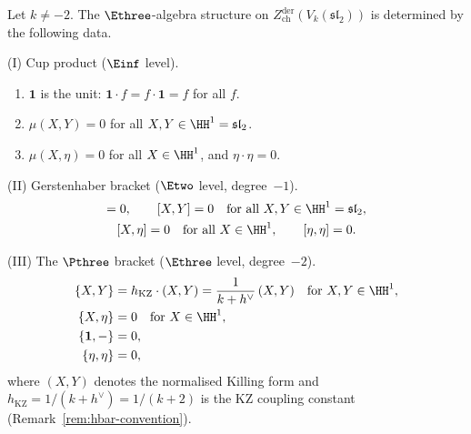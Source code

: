 \begin{proposition}
\label{prop:e3-explicit-sl2}
Let $k \neq -2$.
The $\Ethree$-algebra structure on
$Z^{\mathrm{der}}_{\mathrm{ch}}(V_k(\mathfrak{sl}_2))$
is determined by the following data.

\smallskip
\noindent
\textup{(I) Cup product} ($\Einf$ level).
\begin{enumerate}[label=\textup{(\alph*)}]
\item $\mathbf{1}$ is the unit:
  $\mathbf{1} \cdot f = f \cdot \mathbf{1} = f$ for all $f$.
\item
  $\mu(X, Y) = 0$ for all $X, Y \in \HH^1 = \mathfrak{sl}_2$.
\item
  $\mu(X, \eta) = 0$ for all $X \in \HH^1$, and
  $\eta \cdot \eta = 0$.
\end{enumerate}

\smallskip
\noindent
\textup{(II) Gerstenhaber bracket} ($\Etwo$ level,
degree~$-1$).
\begin{gather*}
  [\mathbf{1}, -] = 0, \qquad
  [X, Y] = 0 \quad \text{for all }
  X, Y \in \HH^1 = \mathfrak{sl}_2, \\
  [X, \eta] = 0 \quad \text{for all } X \in \HH^1,
  \qquad [\eta, \eta] = 0.
\end{gather*}

\smallskip
\noindent
\textup{(III) The $\Pthree$ bracket} ($\Ethree$ level,
degree~$-2$).
\begin{align}
  \label{eq:e3-p3-killing}
  \{X, Y\}
  &= h_{\mathrm{KZ}} \cdot (X, Y)
  = \frac{1}{k + h^\vee}\,(X, Y)
  \quad \text{for } X, Y \in \HH^1,
  \\
  \label{eq:e3-p3-derivation}
  \{X, \eta\}
  &= 0
  \quad \text{for } X \in \HH^1,
  \\
  \label{eq:e3-p3-unit}
  \{\mathbf{1}, -\}
  &= 0,
  \\
  \label{eq:e3-p3-top}
  \{\eta, \eta\}
  &= 0,
\end{align}
where $(X, Y)$ denotes the normalised Killing form
and $h_{\mathrm{KZ}} = 1/(k + h^\vee) = 1/(k + 2)$ is
the KZ coupling constant
\textup{(}Remark~\textup{\ref{rem:hbar-convention}}\textup{)}.
\end{proposition}

